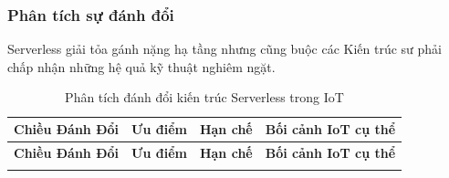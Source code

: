 \subsubsection{Phân tích sự đánh đổi}
\label{subsec:serverless-tradeoff}

Serverless giải tỏa gánh nặng hạ tầng nhưng cũng buộc các Kiến trúc sư phải chấp nhận những hệ quả kỹ thuật nghiêm ngặt.

\begin{longtable}{c p{4cm} p{4cm} p{4cm}}

\caption{Phân tích đánh đổi kiến trúc Serverless trong IoT}\\

\toprule
\textbf{Chiều Đánh Đổi} & \textbf{Ưu điểm} & \textbf{Hạn chế} & \textbf{Bối cảnh IoT cụ thể} \\
\midrule
\endfirsthead

\toprule
\textbf{Chiều Đánh Đổi} & \textbf{Ưu điểm} & \textbf{Hạn chế} & \textbf{Bối cảnh IoT cụ thể} \\
\midrule
\endhead

\bottomrule
\endfoot


\end{longtable}
